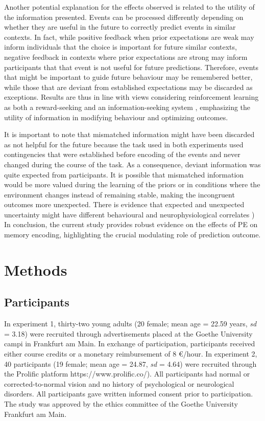 \documentclass[a4paper,12pt]{article} 			%
\begin{document}
 Another potential explanation for the effects observed is related to the utility of the information presented. Events can be processed differently depending on whether they are useful in the future to correctly predict events in similar contexts. In fact, while positive feedback when prior expectations are weak may inform individuals that the choice is important for future similar contexts, negative feedback in contexts where prior expectations are strong may inform participants that that event is not useful for future predictions. Therefore, events that might be important to guide future behaviour may be remembered better, while those that are deviant from established expectations may be discarded as exceptions. Results are thus in line with views considering reinforcement learning as both a reward-seeking and an information-seeking system \cite{ESBromberg-Martin2011, Niv2011}⁠, emphasizing the utility of information in modifying behaviour and optimizing outcomes. \par
It is important to note that mismatched information might have been discarded as not helpful for the future because the task used in both experiments used contingencies that were established before encoding of the events and never changed during the course of the task. As a consequence, deviant information was quite expected from participants. It is possible that mismatched information would be more valued during the learning of the priors or in conditions where the environment changes instead of remaining stable, making the incongruent outcomes more unexpected. There is evidence that expected and unexpected uncertainty might have different behavioural and neurophysiological correlates \cite{Yu2005})⁠
In conclusion, the current study provides robust evidence on the effects of PE on memory encoding, highlighting the crucial modulating role of prediction outcome. 


\section{Methods}
\subsection{Participants}
In experiment 1, thirty-two young adults (20 female; mean age = 22.59 years, \textit{sd} = 3.18) were recruited through advertisements placed at the Goethe University campi in Frankfurt am Main. In exchange of participation, participants received either course credits or a monetary reimbursement of 8 €/hour. 
In experiment 2, 40 participants (19 female; mean age = 24.87, \textit{sd} = 4.64) were recruited through the Prolific platform https://www.prolific.co/). All participants had normal or corrected-to-normal vision and no history of psychological or neurological disorders. All participants gave written informed consent prior to participation. The study was approved by the ethics committee of the Goethe University Frankfurt am Main. 
\end{document}
